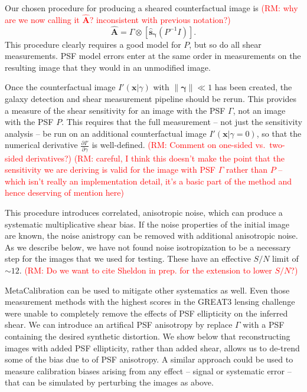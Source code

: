 \documentclass[iop]{emulateapj}
\newcommand\rmcomment[1]{\textcolor{red}{(RM: #1)}}
\begin{document}
Our chosen procedure for producing a sheared counterfactual image is \rmcomment{why are we now
  calling it $\hat{\mathbf{A}}$?  inconsistent with previous notation?}
\begin{equation}
\hat{\mathbf{A}}  = \Gamma \otimes \left[\hat{\mathbf{s}}_{\boldsymbol \gamma} \left(P^{-1} I \right)\right].
\end{equation}
This procedure clearly requires a good model for $P$, but so do all
shear measurements. PSF model errors enter at the
same order in measurements on the resulting image that they would in
an unmodified image.

Once the counterfactual image $I'(\mathbf{x}|\gamma)$ with
$\|{\boldsymbol \gamma}\| \ll 1$ has been created, the galaxy detection
and shear measurement pipeline should be rerun. This provides a
measure of the shear sensitivity for an image with the PSF $\Gamma$,
not an image with the PSF $P$. This requires that the full measurement
-- not just the sensitivity analysis -- be run on an additional
counterfactual image $I'(\mathbf{x}|\gamma=0)$,  so that the numerical
derivative $\frac{\partial I'}{\partial \gamma}$ is well-defined. \rmcomment{Comment on one-sided vs.\
  two-sided derivatives?}  \rmcomment{careful, I think this doesn't make the point
  that the sensitivity we are deriving is valid for the image with PSF $\Gamma$ rather than $P$ --
  which isn't really an implementation detail, it's a basic part of the method and hence deserving
  of mention here}

This procedure introduces correlated, anisotropic noise, which can
produce a systematic multiplicative shear bias. If the noise
properties of the initial image are known, the noise anistropy can be
removed with additional anisotropic noise. As we describe below, we
have not found noise isotropization to be a necessary step for the images that we used for testing.
These have an effective $S/N$ limit of $\sim 12$.  \rmcomment{Do we want to cite Sheldon in
  prep. for the extension to lower $S/N$?}

MetaCalibration can be used to mitigate other systematics as
well. Even those measurement methods with the highest scores in the
GREAT3 lensing challenge were unable to completely remove the effects
of PSF ellipticity on the inferred shear. We can introduce an
artifical PSF anisotropy by replace $\Gamma$ with a PSF containing the
desired synthetic distortion.  We show below that reconstructing
images with added PSF ellipticity, rather than added shear, allows us
to de-trend some of the bias due to of PSF anisotropy. A similar approach
could be used to measure calibration biases arising from any effect --
signal or systematic error -- that can be simulated by perturbing the
images as above.
\end{document}

